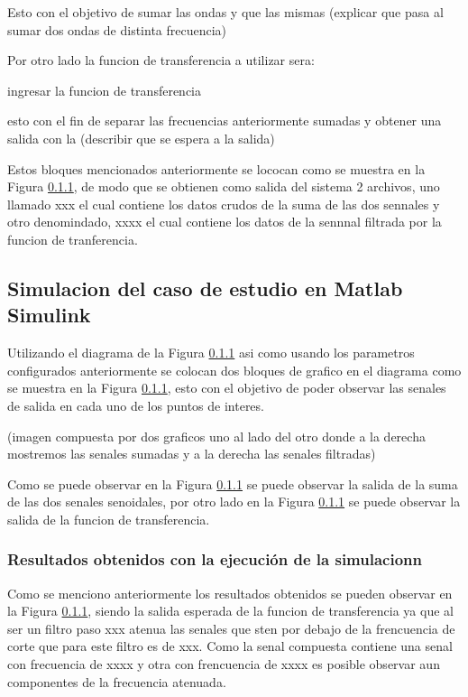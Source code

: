 Esto con el objetivo de sumar las ondas y que las mismas (explicar que pasa al sumar dos ondas de distinta frecuencia)

Por otro lado la funcion de transferencia a utilizar sera:

ingresar la funcion de transferencia

esto con el fin de separar las frecuencias anteriormente sumadas y obtener una salida con la (describir que se espera a la salida)

Estos bloques mencionados anteriormente se lococan como se muestra en la Figura \ref{}, de modo que se obtienen como salida del sistema 2 archivos, uno llamado xxx el cual contiene los datos crudos de la suma de las dos sennales y otro denomindado, xxxx el cual contiene los datos de la sennnal filtrada por la funcion de tranferencia. 

\subsection{Simulacion del caso de estudio en Matlab Simulink}\label{subsec:simulacion_caso_de_estudio}

Utilizando el diagrama de la Figura \ref{} asi como usando los parametros configurados anteriormente se colocan dos bloques de grafico en el diagrama como se muestra en la Figura \ref{}, esto con el objetivo de poder observar las senales de salida en cada uno de los puntos de interes. 

(imagen compuesta por dos graficos uno al lado del otro donde a la derecha mostremos las senales sumadas y a la derecha las senales filtradas)

Como se puede observar en la Figura \ref{} se puede observar la salida de la suma de las dos senales senoidales, por otro lado en la Figura \ref{} se puede observar la salida de la funcion de transferencia.

\subsubsection{Resultados obtenidos con la ejecución de la simulacionn}

Como se menciono anteriormente los resultados obtenidos se pueden observar en la Figura \ref{}, siendo la salida esperada de la funcion de transferencia ya que al ser un filtro paso xxx atenua las senales que sten por debajo de la frencuencia de corte que para este filtro es de xxx. Como la senal compuesta contiene una senal con frecuencia de xxxx y otra con frencuencia de xxxx es posible observar aun componentes de la frecuencia atenuada.

